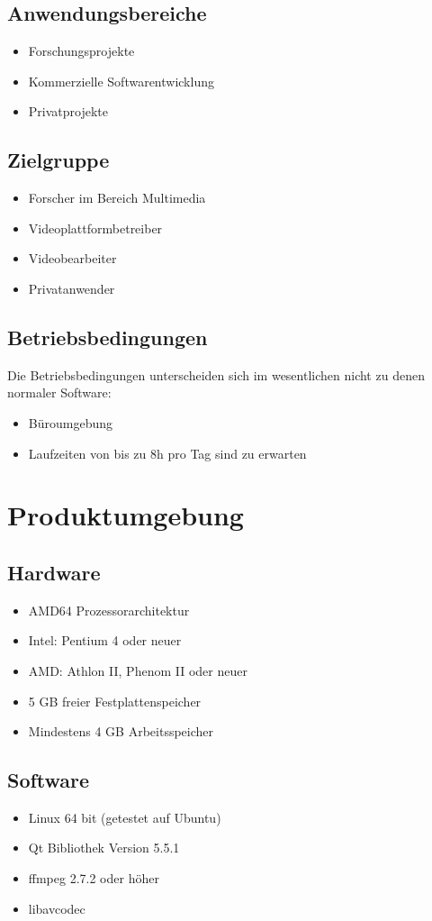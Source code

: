 \documentclass[parskip=full]{scrartcl}
\begin{document}
\subsection{Anwendungsbereiche}
\begin{itemize}
\item Forschungsprojekte
\item Kommerzielle Softwarentwicklung
\item Privatprojekte
\end{itemize}
\subsection{Zielgruppe}
\begin{itemize}
\item Forscher im Bereich Multimedia
\item Videoplattformbetreiber
\item Videobearbeiter
\item Privatanwender
\end{itemize}
\subsection{Betriebsbedingungen}
Die Betriebsbedingungen unterscheiden sich im wesentlichen nicht zu denen normaler Software:
\begin{itemize}
\item Büroumgebung
\item Laufzeiten von bis zu 8h pro Tag sind zu erwarten
\end{itemize}
\newpage
\section{Produktumgebung}

\subsection{Hardware}
\begin{itemize}
\item AMD64 Prozessorarchitektur
\item Intel: Pentium 4 oder neuer
\item AMD: Athlon II, Phenom II oder neuer
\item 5 GB freier Festplattenspeicher
\item Mindestens 4 GB Arbeitsspeicher
\end{itemize}
\subsection{Software}
\begin{itemize}
\item Linux 64 bit (getestet auf Ubuntu)
\item Qt Bibliothek Version 5.5.1
\item ffmpeg 2.7.2 oder höher
\item libavcodec
\end{itemize}
\newpage
\end{document}
